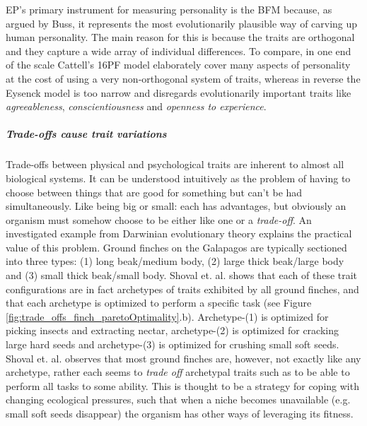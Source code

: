 EP's primary instrument for measuring personality is the BFM because, as argued by Buss, it represents the most evolutionarily plausible way of carving up human personality. The main reason for this is because the traits are orthogonal and they capture a wide array of individual differences. To compare, in one end of the scale Cattell's 16PF model elaborately cover many aspects of personality at the cost of using a very non-orthogonal system of traits, whereas in reverse the Eysenck model is too narrow and disregards evolutionarily important traits like \textit{agreeableness}, \textit{conscientiousness} and \textit{openness to experience}.

\subparagraph*{Trade-offs cause trait variations}
Trade-offs between physical and psychological traits are inherent to almost all biological systems. It can be understood intuitively as the problem of having to choose between things that are good for something but can't be had simultaneously. Like being big or small: each has advantages, but obviously an organism must somehow choose to be either like one or a \textit{trade-off}. An investigated example from Darwinian evolutionary theory explains the practical value of this problem. 
Ground finches on the Galapagos are typically sectioned into three types: (1) long beak/medium body, (2) large thick beak/large body and (3) small thick beak/small body. Shoval et. al. shows that each of these trait configurations are in fact archetypes of traits exhibited by all ground finches, and that each archetype is optimized to perform a specific task (see Figure \ref{fig:trade_offs_finch_paretoOptimality}.b). Archetype-(1) is optimized for picking insects and extracting nectar, archetype-(2) is optimized for cracking large hard seeds and archetype-(3) is optimized for crushing small soft seeds. Shoval et. al. observes that most ground finches are, however, not exactly like any archetype, rather each seems to \textit{trade off} archetypal traits such as to be able to perform all tasks to some ability. This is thought to be a strategy for coping with changing ecological pressures, such that when a niche becomes unavailable (e.g. small soft seeds disappear) the organism has other ways of leveraging its fitness.

